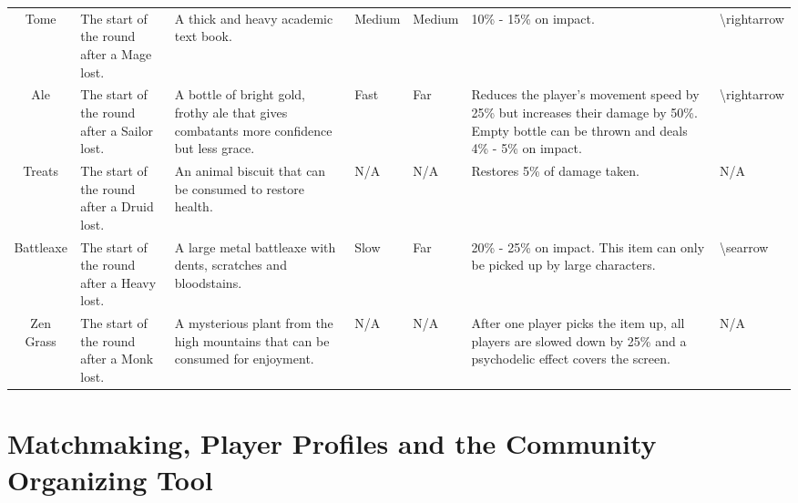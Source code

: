 \begin{table}[h!]
\begin{tabular}{cllllll}
Tome             & The start of the round after a Mage lost.                           & A thick and heavy academic text book.                                                     & Medium                       & Medium                       & 10\% - 15\% on impact.                                                                                                                    & \textbackslash{}rightarrow              \\
Ale              & The start of the round after a Sailor lost.                         & A bottle of bright gold, frothy ale that gives combatants more confidence but less grace. & Fast                         & Far                          & Reduces the player's movement speed by 25\% but increases their damage by 50\%. Empty bottle can be thrown and deals 4\% - 5\% on impact. & \textbackslash{}rightarrow              \\
Treats           & The start of the round after a Druid lost.                          & An animal biscuit that can be consumed to restore health.                                 & N/A                          & N/A                          & Restores 5\% of damage taken.                                                                                                             & N/A                                     \\
Battleaxe        & The start of the round after a Heavy lost.                          & A large metal battleaxe with dents, scratches and bloodstains.                            & Slow                         & Far                          & 20\% - 25\% on impact. This item can only be picked up by large characters.                                                               & \textbackslash{}searrow                 \\
Zen Grass        & The start of the round after a Monk lost.                           & A mysterious plant from the high mountains that can be consumed for enjoyment.            & N/A                          & N/A                          & After one player picks the item up, all players are slowed down by 25\% and a psychodelic effect covers the screen.                       & N/A                                    
\end{tabular}
\end{table}

\section{Matchmaking, Player Profiles and the Community Organizing Tool}


